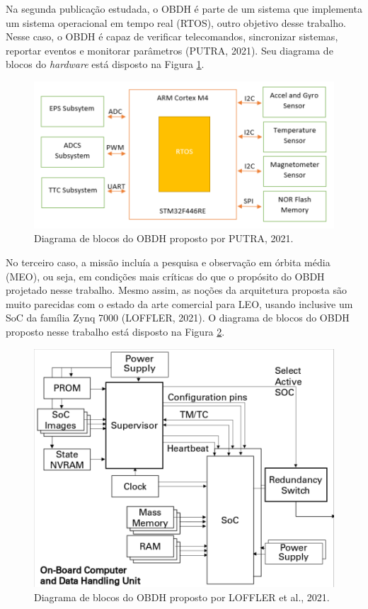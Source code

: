 Na segunda publicação estudada, o OBDH é parte de um sistema que implementa um sistema operacional em tempo real (RTOS), outro objetivo desse trabalho. Nesse caso, o OBDH é capaz de verificar telecomandos, sincronizar sistemas, reportar eventos e monitorar parâmetros (PUTRA, 2021). Seu diagrama de blocos do \textit{hardware} está disposto na Figura \ref{fig:putra}.

\begin{figure}[H]
    \centering
    \includegraphics[scale=0.8]{images/putra.png}
    \caption{Diagrama de blocos do OBDH proposto por PUTRA, 2021.}
    \label{fig:putra}
\end{figure}

No terceiro caso, a missão incluía a pesquisa e observação em órbita média (MEO), ou seja, em condições mais críticas do que o propósito do OBDH projetado nesse trabalho. Mesmo assim, as noções da arquitetura proposta são muito parecidas com o estado da arte comercial para LEO, usando inclusive um SoC da família Zynq 7000 (LOFFLER, 2021). O diagrama de blocos do OBDH proposto nesse trabalho está disposto na Figura \ref{fig:loffler}.

\begin{figure}[H]
    \centering
    \includegraphics[scale=0.8]{images/loffler.png}
    \caption{Diagrama de blocos do OBDH proposto por LOFFLER et al., 2021.}
    \label{fig:loffler}
\end{figure}


